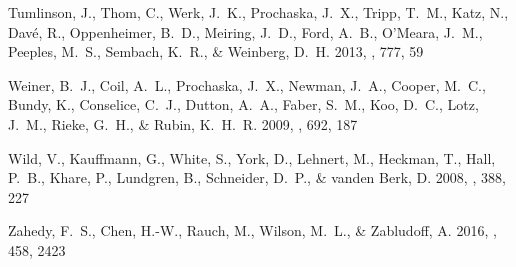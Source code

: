 \documentclass[iop]{emulateapj}
\begin{document}
\begin{thebibliography}{45}
{Tumlinson}, J., {Thom}, C., {Werk}, J.~K., {Prochaska}, J.~X., {Tripp}, T.~M.,
  {Katz}, N., {Dav{\'e}}, R., {Oppenheimer}, B.~D., {Meiring}, J.~D., {Ford},
  A.~B., {O'Meara}, J.~M., {Peeples}, M.~S., {Sembach}, K.~R., \& {Weinberg},
  D.~H. 2013, \apj, 777, 59

{Weiner}, B.~J., {Coil}, A.~L., {Prochaska}, J.~X., {Newman}, J.~A., {Cooper},
  M.~C., {Bundy}, K., {Conselice}, C.~J., {Dutton}, A.~A., {Faber}, S.~M.,
  {Koo}, D.~C., {Lotz}, J.~M., {Rieke}, G.~H., \& {Rubin}, K.~H.~R. 2009, \apj,
  692, 187

{Wild}, V., {Kauffmann}, G., {White}, S., {York}, D., {Lehnert}, M., {Heckman},
  T., {Hall}, P.~B., {Khare}, P., {Lundgren}, B., {Schneider}, D.~P., \&
  {vanden Berk}, D. 2008, \mnras, 388, 227

{Zahedy}, F.~S., {Chen}, H.-W., {Rauch}, M., {Wilson}, M.~L., \& {Zabludoff},
  A. 2016, \mnras, 458, 2423

\end{thebibliography}
\end{document}
